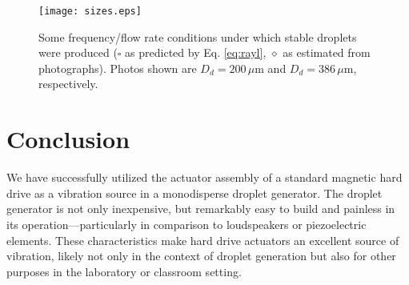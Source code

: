 \documentclass[aip,rsi,reprint,graphicx]{revtex4-1} %
\begin{document}
\begin{figure}[h!]
\centering
\texttt{[image: sizes.eps]}
\caption{Some frequency/flow rate conditions under which stable droplets were
        produced ($\square$ as predicted by Eq. \ref{eq:rayl},
        {\Large$\diamond$} as estimated
        from photographs). Photos shown are $D_d = 200\,\mu$m and $D_d = 386\,\mu$m,
        respectively.
       \label{fig:dropphoto}}
\end{figure}
\section{Conclusion}
We have successfully utilized the actuator assembly of a standard magnetic hard
drive as a vibration source in a monodisperse droplet generator. The droplet
generator is not only inexpensive, but remarkably easy to build and painless in
its operation---particularly in comparison to loudspeakers or piezoelectric elements.
These characteristics make hard drive actuators an excellent source of
vibration, likely not only in the context of droplet generation but also for other
purposes in the laboratory or classroom setting.

\end{document}
